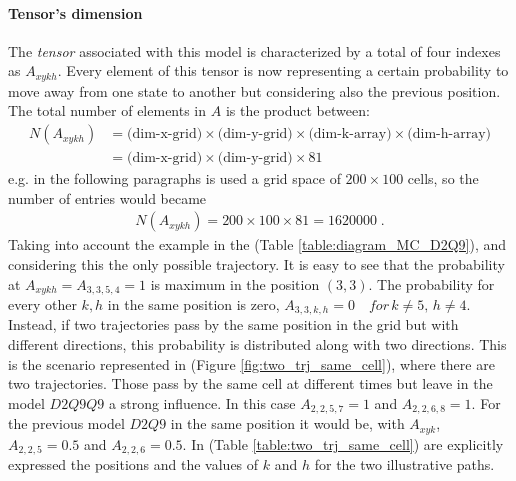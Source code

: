 \documentclass[class=article, crop=false]{standalone}
\begin{document}
\paragraph{Tensor's dimension}
The \emph{tensor} associated with this model is characterized by a total of four indexes as $A_{x y k h}$.
Every element of this tensor is now representing a certain probability to move away from one state to another but considering also the previous position.
The total number of elements in $A$ is the product between:
\begin{equation*}
\begin{split}
N(A_{xykh}) &= \mbox{(dim-x-grid)} \times \mbox{(dim-y-grid)} \times \mbox{(dim-k-array)} \times \mbox{(dim-h-array)} \\
& = \mbox{(dim-x-grid)} \times \mbox{(dim-y-grid)} \times 81
\end{split}
\end{equation*}
e.g. in the following paragraphs is used a grid space of $200\times100$ cells, so the number of entries would became 
\begin{equation*}
\begin{split}
N(A_{xykh})=200\times100\times 81 = 1620000 \; .
\end{split}
\end{equation*}
Taking into account the example in the (Table \ref{table:diagram_MC_D2Q9}), and considering this the only possible trajectory.
It is easy to see that the probability at $A_{x y k h} = A_{3, 3, 5, 4} = 1$ is maximum in the position $(3, 3)$.
The probability for every other $k, h$ in the same position is zero, $A_{3, 3, k, h} = 0 \quad for \, k \neq 5, \, h \neq 4$.
Instead, if two trajectories pass by the same position in the grid but with different directions, this probability is distributed along with two directions.
This is the scenario represented in (Figure \ref{fig:two_trj_same_cell}), where there are two trajectories.
Those pass by the same cell at different times but leave in the model $D2Q9Q9$ a strong influence.
In this case $A_{2, 2, 5, 7} = 1$ and $A_{2, 2, 6, 8} = 1$.
For the previous model $D2Q9$ in the same position it would be, with $A_{x y k}$, $A_{2, 2, 5} = 0.5$ and $A_{2, 2, 6} = 0.5$.
In (Table \ref{table:two_trj_same_cell}) are explicitly expressed the positions and the values of $k$ and $h$ for the two illustrative paths.
\end{document}
